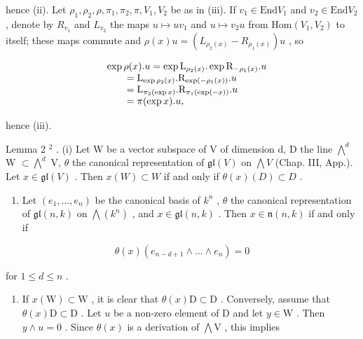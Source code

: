 hence (ii). Let \(\rho_1, \rho_2, \rho, \pi_1, \pi_2, \pi, V_1, V_2\) be as in (iii). If \(v_1 \in \mathrm{End}V_1\) and \(v_2 \in \mathrm{End}V_2\) , denote by \(R_{v_1}\) and \(L_{v_2}\) the maps \(u \mapsto uv_1\) and \(u \mapsto v_2u\) from \(\mathrm{Hom}(V_1, V_2)\) to itself; these maps commute and \(\rho(x)u = (L_{\rho_2(x)} - R_{\rho_1(x)})u\) , so

\[
\begin{array}{r l} & {\exp \rho (x). u = \exp \mathrm{L} _ {\rho_ {2} (x)}. \exp \mathrm{R} _ {- \rho_ {1} (x)}. u} \\ & {\qquad = \mathrm{L} _ {\exp \rho_ {2} (x)}. \mathrm{R} _ {\exp (- \rho_ {1} (x))}. u} \\ & {\qquad = \mathrm{L} _ {\pi_ {2} (\exp x)}. \mathrm{R} _ {\pi_ {1} (\exp (- x))}. u} \\ & {\qquad = \pi (\exp x). u,} \end{array}
\]

hence (iii).

Lemma 2 \(^{2}\) . (i) Let W be a vector subspace of V of dimension d, D the line \(\bigwedge^{d}\) W \(\subset \bigwedge^{d}\) V, \(\theta\) the canonical representation of \(\mathfrak{gl}(V)\) on \(\bigwedge V\) (Chap. III, App.). Let \(x \in \mathfrak{gl}(V)\) . Then \(x(W) \subset W\) if and only if \(\theta(x)(D) \subset D\) .

\begin{enumerate}
\def\labelenumi{(\roman{enumi})}
\setcounter{enumi}{1}
\tightlist
\item
  Let \((e_{1},\ldots,e_{n})\) be the canonical basis of \(k^{n}\) , \(\theta\) the canonical representation of \(\mathfrak{gl}(n,k)\) on \(\bigwedge(k^{n})\) , and \(x\in\mathfrak{gl}(n,k)\) . Then \(x\in\mathfrak{n}(n,k)\) if and only if
\end{enumerate}

\[
\theta (x) (e _ {n - d + 1} \wedge \dots \wedge e _ {n}) = 0
\]

for \(1 \leq d \leq n\) .


\begin{enumerate}
\def\labelenumi{(\roman{enumi})}
\tightlist
\item
  If \(x(\mathrm{W}) \subset \mathrm{W}\) , it is clear that \(\theta(x)\mathrm{D} \subset \mathrm{D}\) . Conversely, assume that \(\theta(x)\mathrm{D} \subset \mathrm{D}\) . Let \(u\) be a non-zero element of \(\mathrm{D}\) and let \(y \in \mathrm{W}\) . Then \(y \wedge u = 0\) . Since \(\theta(x)\) is a derivation of \(\bigwedge \mathrm{V}\) , this implies
\end{enumerate}

